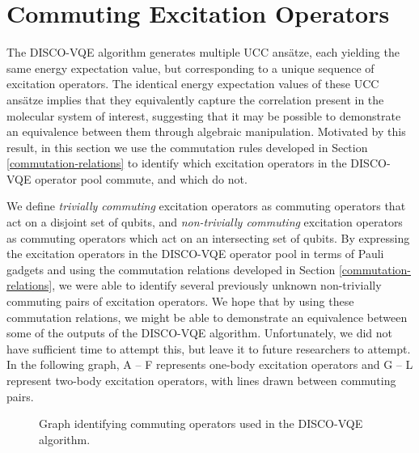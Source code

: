 \section{Commuting Excitation Operators}%
\label{operator-commutations}

The DISCO-VQE algorithm generates multiple UCC ansätze, each yielding the same energy expectation value, but corresponding to a unique sequence of excitation operators. The identical energy expectation values of these UCC ansätze implies that they equivalently capture the correlation present in the molecular system of interest, suggesting that it may be possible to demonstrate an equivalence between them through algebraic manipulation. Motivated by this result, in this section we use the commutation rules developed in Section \ref{commutation-relations} to identify which excitation operators in the DISCO-VQE operator pool commute, and which do not.

We define \textit{trivially commuting} excitation operators as commuting operators that act on a disjoint set of qubits, and \textit{non-trivially commuting} excitation operators as commuting operators which act on an intersecting set of qubits. By expressing the excitation operators in the DISCO-VQE operator pool in terms of Pauli gadgets and using the commutation relations developed in Section \ref{commutation-relations}, we were able to identify several previously unknown non-trivially commuting pairs of excitation operators. We hope that by using these commutation relations, we might be able to demonstrate an equivalence between some of the outputs of the DISCO-VQE algorithm. Unfortunately, we did not have sufficient time to attempt this, but leave it to future researchers to attempt. In the following graph, A -- F represents one-body excitation operators and G -- L represent two-body excitation operators, with lines drawn between commuting pairs.

\begin{figure}[H]
    \centering
    \caption{Graph identifying commuting operators used in the DISCO-VQE algorithm.}
\end{figure}

